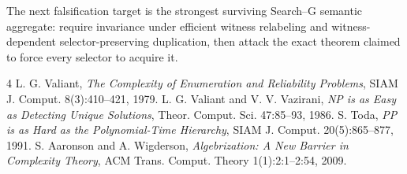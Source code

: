 \documentclass[11pt]{article}
\begin{document}
The next falsification target is the strongest surviving Search--G semantic aggregate: require invariance under efficient witness relabeling and witness-dependent selector-preserving duplication, then attack the exact theorem claimed to force every selector to acquire it.

\begin{thebibliography}{4}
 L. G. Valiant, \emph{The Complexity of Enumeration and Reliability Problems}, SIAM J. Comput. 8(3):410--421, 1979.
 L. G. Valiant and V. V. Vazirani, \emph{NP is as Easy as Detecting Unique Solutions}, Theor. Comput. Sci. 47:85--93, 1986.
 S. Toda, \emph{PP is as Hard as the Polynomial-Time Hierarchy}, SIAM J. Comput. 20(5):865--877, 1991.
 S. Aaronson and A. Wigderson, \emph{Algebrization: A New Barrier in Complexity Theory}, ACM Trans. Comput. Theory 1(1):2:1--2:54, 2009.
\end{thebibliography}
\end{document}
